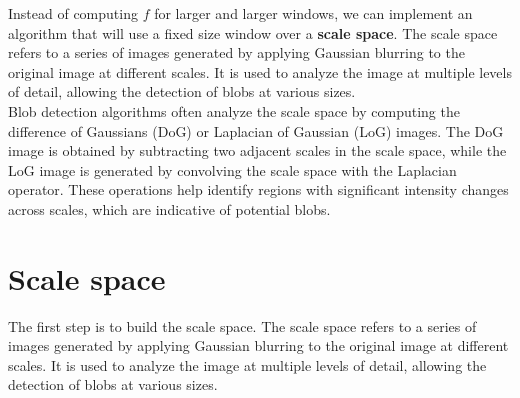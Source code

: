 \documentclass{article}
\begin{document}
Instead of computing $f$ for larger and larger windows, we can implement an algorithm that will use a fixed size window over a \textbf{scale space}. The scale space refers to a series of images generated by applying Gaussian blurring to the original image at different scales. It is used to analyze the image at multiple levels of detail, allowing the detection of blobs at various sizes.\\ 

Blob detection algorithms often analyze the scale space by computing the difference of Gaussians (DoG) or Laplacian of Gaussian (LoG) images. The DoG image is obtained by subtracting two adjacent scales in the scale space, while the LoG image is generated by convolving the scale space with the Laplacian operator. These operations help identify regions with significant intensity changes across scales, which are indicative of potential blobs. \\

\section*{Scale space}

The first step is to build the scale space. The scale space refers to a series of images generated by applying Gaussian blurring to the original image at different scales. It is used to analyze the image at multiple levels of detail, allowing the detection of blobs at various sizes.
\end{document}
